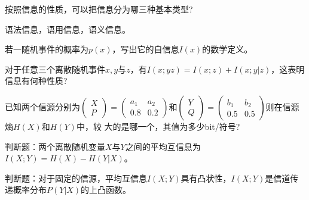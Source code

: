 \begin{problem}
	按照信息的性质，可以把信息分为哪三种基本类型?
\end{problem}
\begin{solution}
	语法信息，语用信息，语义信息。
\end{solution}


\begin{problem}
	若一随机事件的概率为$p(x)$，写出它的自信息$I(x)$的数学定义。
\end{problem}
\begin{solution}
	
\end{solution}


\begin{problem}
	对于任意三个离散随机事件$x,y$与$z$，有$I(x;yz)=I(x;z)+I(x;y|z)$，这表明信息有何种性质?
\end{problem}
\begin{solution}

\end{solution}


\begin{problem}
	已知两个信源分别为$\begin{pmatrix}X\\P\end{pmatrix}=\begin{pmatrix}a_1&a_2\\0.8&0.2\end{pmatrix}$和$\begin{pmatrix}Y\\Q\end{pmatrix}=\begin{pmatrix}b_1&b_2\\0.5&0.5\end{pmatrix}$则在信源熵$H(X)$和$H(Y)$中，较 大的是哪一个，其值为多少bit/符号?
\end{problem}
\begin{solution}

\end{solution}


\begin{problem}
	判断题：两个离散随机变量$X$与$Y$之间的平均互信息为$I(X;Y)=H(X)-H(Y|X)$。
\end{problem}
\begin{solution}

\end{solution}


\begin{problem}
	判断题：对于固定的信源，平均互信息$I(X;Y)$具有凸状性，$I(X;Y)$是信道传递概率分布$P(Y|X)$的上凸函数。
\end{problem}
\begin{solution}

\end{solution}


